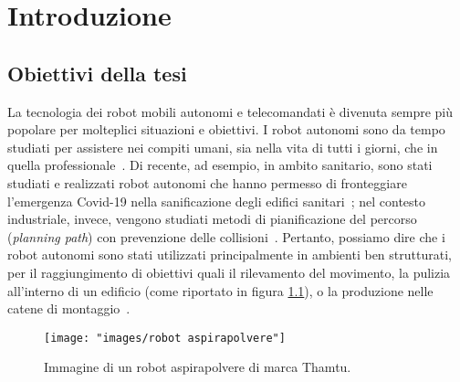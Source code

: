 \chapter{Introduzione}

\section{Obiettivi della tesi}

La tecnologia dei robot mobili autonomi e telecomandati è divenuta sempre più popolare per molteplici situazioni e obiettivi. I robot autonomi sono da tempo studiati per assistere nei compiti umani, sia nella vita di tutti i giorni, che in quella professionale~\cite{1,2}. Di recente, ad esempio, in ambito sanitario, sono stati studiati e realizzati robot autonomi che hanno permesso di fronteggiare l'emergenza Covid-19 nella sanificazione degli edifici sanitari~\cite{3}; nel contesto industriale, invece, vengono studiati metodi di pianificazione del percorso (\textit{planning path}) con prevenzione delle collisioni~\cite{4,5}. Pertanto, possiamo dire che i robot autonomi sono stati utilizzati principalmente in ambienti ben strutturati, per il raggiungimento di obiettivi quali il rilevamento del movimento, la pulizia all'interno di un edificio (come riportato in figura \ref{fig:robot-aspirapolvere}), o la produzione nelle catene di montaggio~\cite{6, 7}.
\begin{figure}[h]
	\centering
	\texttt{[image: "images/robot aspirapolvere"]}
	\caption{Immagine di un robot aspirapolvere di marca Thamtu.}
	\label{fig:robot-aspirapolvere}
\end{figure}
 
